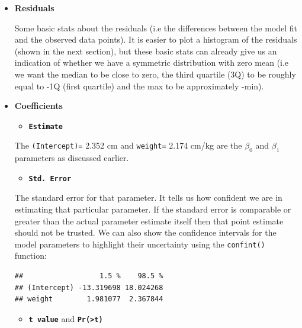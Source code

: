 \documentclass[]{book}
\newenvironment{Shaded}{\begin{snugshade}}{\end{snugshade}}
\newcommand{\KeywordTok}[1]{\textcolor[rgb]{0.13,0.29,0.53}{\textbf{#1}}}
\newcommand{\DataTypeTok}[1]{\textcolor[rgb]{0.13,0.29,0.53}{#1}}
\newcommand{\FloatTok}[1]{\textcolor[rgb]{0.00,0.00,0.81}{#1}}
\newcommand{\NormalTok}[1]{#1}
\providecommand{\tightlist}{%
  \setlength{\itemsep}{0pt}\setlength{\parskip}{0pt}}
\theoremstyle{definition}
\theoremstyle{definition}
\theoremstyle{definition}
\theoremstyle{remark}
\begin{document}
\newpage

\begin{itemize}
\item
  \textbf{Residuals}

  Some basic stats about the residuals (i.e the differences between the
  model fit and the observed data points). It is easier to plot a
  histogram of the residuals (shown in the next section), but these
  basic stats can already give us an indication of whether we have a
  symmetric distribution with zero mean (i.e we want the median to be
  close to zero, the third quartile (3Q) to be roughly equal to -1Q
  (first quartile) and the max to be approximately -min).
\item
  \textbf{Coefficients}

  \begin{itemize}
  \tightlist
  \item
    \textbf{\texttt{Estimate}}
  \end{itemize}

  The \texttt{(Intercept)=} 2.352 cm and \texttt{weight=} 2.174 cm/kg
  are the \(\beta_0\) and \(\beta_1\) parameters as discussed earlier.

  \begin{itemize}
  \tightlist
  \item
    \textbf{\texttt{Std.\ Error}}
  \end{itemize}

  The standard error for that parameter. It tells us how confident we
  are in estimating that particular parameter. If the standard error is
  comparable or greater than the actual parameter estimate itself then
  that point estimate should not be trusted. We can also show the
  confidence intervals for the model parameters to highlight their
  uncertainty using the \texttt{confint()} function:

\begin{Shaded}
\end{Shaded}

\begin{verbatim}
##                  1.5 %    98.5 %
## (Intercept) -13.319698 18.024268
## weight        1.981077  2.367844
\end{verbatim}

  \begin{itemize}
  \tightlist
  \item
    \textbf{\texttt{t\ value}} and
    \textbf{\texttt{Pr(\textgreater{}\textbar{}t\textbar{})}}
  \end{itemize}


\end{itemize}
\end{document}
